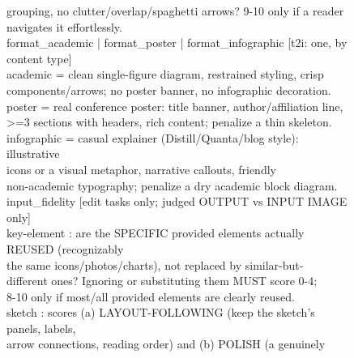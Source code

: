 \documentclass{llmxive}
\begin{document}
\begin{figure}[t]
\begin{tcolorbox}
\hspace*{1.0em}grouping, no clutter/overlap/spaghetti arrows? 9-10 only if a reader \\
\hspace*{1.0em}navigates it effortlessly. \\[5pt]
format\_academic | format\_poster | format\_infographic   [t2i: one, by content type] \\
\hspace*{1.0em}academic    = clean single-figure diagram, restrained styling, crisp \\
\hspace*{8.0em}components/arrows; no poster banner, no infographic decoration. \\
\hspace*{1.0em}poster      = real conference poster: title banner, author/affiliation line, \\
\hspace*{8.0em}>=3 sections with headers, rich content; penalize a thin skeleton. \\
\hspace*{1.0em}infographic = casual explainer (Distill/Quanta/blog style): illustrative \\
\hspace*{8.0em}icons or a visual metaphor, narrative callouts, friendly \\
\hspace*{8.0em}non-academic typography; penalize a dry academic block diagram. \\[5pt]
input\_fidelity   [edit tasks only; judged OUTPUT vs INPUT IMAGE only] \\
\hspace*{1.0em}key-element : are the SPECIFIC provided elements actually REUSED (recognizably \\
\hspace*{8.0em}the same icons/photos/charts), not replaced by similar-but- \\
\hspace*{8.0em}different ones? Ignoring or substituting them MUST score 0-4; \\
\hspace*{8.0em}8-10 only if most/all provided elements are clearly reused. \\
\hspace*{1.0em}sketch      : scores (a) LAYOUT-FOLLOWING (keep the sketch's panels, labels, \\
\hspace*{8.0em}arrow connections, reading order) and (b) POLISH (a genuinely \\

\end{tcolorbox}
\end{figure}
\end{document}
